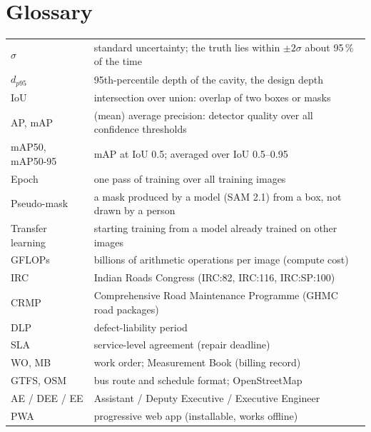 \documentclass[11pt,a4paper]{article}
\begin{document}
\section{Glossary}
\begin{tabularx}{\textwidth}{@{}l X@{}}
\toprule
$\sigma$ & standard uncertainty; the truth lies within $\pm2\sigma$ about 95\,\% of the time\\
$d_{p95}$ & 95th-percentile depth of the cavity, the design depth\\
IoU & intersection over union: overlap of two boxes or masks\\
AP, mAP & (mean) average precision: detector quality over all confidence thresholds\\
mAP50, mAP50-95 & mAP at IoU 0.5; averaged over IoU 0.5--0.95\\
Epoch & one pass of training over all training images\\
Pseudo-mask & a mask produced by a model (SAM 2.1) from a box, not drawn by a person\\
Transfer learning & starting training from a model already trained on other images\\
GFLOPs & billions of arithmetic operations per image (compute cost)\\
IRC & Indian Roads Congress (IRC:82, IRC:116, IRC:SP:100)\\
CRMP & Comprehensive Road Maintenance Programme (GHMC road packages)\\
DLP & defect-liability period\\
SLA & service-level agreement (repair deadline)\\
WO, MB & work order; Measurement Book (billing record)\\
GTFS, OSM & bus route and schedule format; OpenStreetMap\\
AE / DEE / EE & Assistant / Deputy Executive / Executive Engineer\\
PWA & progressive web app (installable, works offline)\\
\bottomrule
\end{tabularx}
\end{document}
